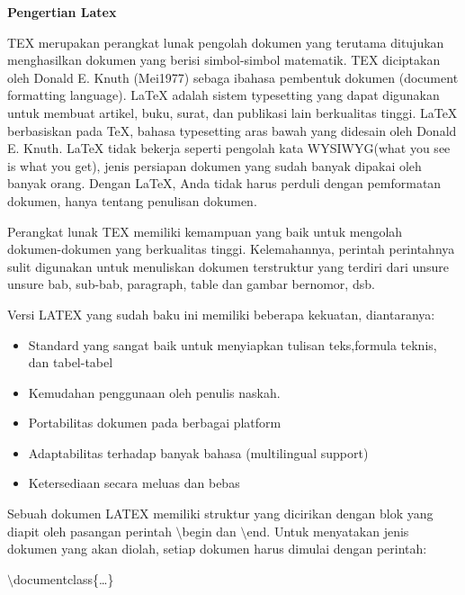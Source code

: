\textbf{Pengertian Latex}\par
\vspace{12pt}
TEX merupakan perangkat lunak pengolah dokumen yang terutama ditujukan menghasilkan dokumen yang berisi simbol-simbol matematik. TEX diciptakan oleh Donald E. Knuth (Mei1977) sebaga ibahasa pembentuk dokumen (document formatting language). LaTeX adalah sistem typesetting yang 
dapat digunakan untuk membuat artikel, buku, surat, dan publikasi lain berkualitas tinggi. LaTeX berbasiskan pada TeX, bahasa typesetting aras bawah yang didesain oleh Donald E. Knuth. LaTeX tidak bekerja seperti pengolah kata WYSIWYG(what you see is what you get), jenis persiapan dokumen yang sudah banyak dipakai oleh banyak orang. Dengan LaTeX, Anda tidak harus perduli dengan pemformatan dokumen, hanya tentang penulisan dokumen.\par 
\vspace{12pt}

Perangkat lunak TEX memiliki kemampuan yang baik untuk mengolah dokumen-dokumen yang berkualitas tinggi. Kelemahannya, perintah perintahnya sulit digunakan untuk menuliskan dokumen terstruktur yang terdiri dari unsure unsure bab, sub-bab, paragraph, table dan gambar bernomor, dsb.\par 
\vspace{12pt}

Versi LATEX yang sudah baku ini memiliki beberapa kekuatan, diantaranya:

\begin{itemize}
\item Standard yang sangat baik untuk menyiapkan tulisan teks,formula 
teknis, dan tabel-tabel
\item Kemudahan penggunaan oleh penulis naskah.
\item Portabilitas dokumen pada berbagai platform
\item Adaptabilitas terhadap banyak bahasa (multilingual support)
\item Ketersediaan secara meluas dan bebas
\end{itemize}
\hspace{0,5in}Sebuah dokumen LATEX memiliki struktur yang dicirikan dengan blok yang diapit oleh pasangan perintah $\setminus$begin dan $\setminus$end. 
Untuk menyatakan jenis dokumen yang akan diolah, setiap dokumen harus dimulai dengan perintah:\par \vspace{12pt} $\setminus$documentclass\{\ldots \}\par \vspace{12pt}

